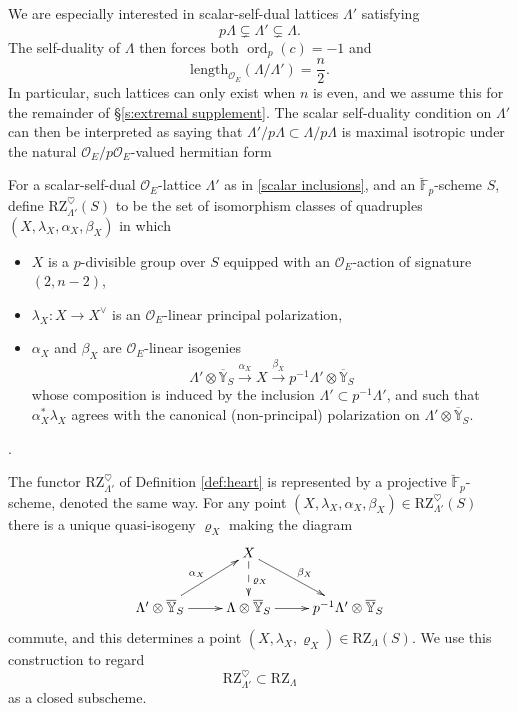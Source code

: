 \documentclass[11pt]{alggeom}
\newcommand{\map}[1]{\xrightarrow{#1}}
\newcommand{\F}{\mathbb F}
\newcommand{\co}{\mathcal O}
\DeclareMathOperator{\ord}{ord}
\begin{document}
We are especially interested in scalar-self-dual lattices $\Lambda'$ satisfying 
\begin{equation}\label{scalar inclusions}
p\Lambda \subsetneq \Lambda' \subsetneq \Lambda.
\end{equation}
The self-duality of $\Lambda$ then forces both $\ord_p(c)= -1$ and
\[
\mathrm{length}_{\co_E}( \Lambda/\Lambda') =\frac{n}{2}  .
\]
In particular, such lattices can only exist when $n$ is even, and we assume this for the remainder of 
\S \ref{s:extremal supplement}.
The scalar self-duality condition on $\Lambda'$ can then be interpreted as saying that 
 $\Lambda'/p\Lambda \subset \Lambda/p\Lambda$ is maximal isotropic under the natural $\co_E/p\co_E$-valued hermitian form



\begin{definition}\label{def:heart}
For a scalar-self-dual $\co_E$-lattice $\Lambda'$ as in \eqref{scalar inclusions},  and an  
$\breve{\F}_p$-scheme $S$, define  $\mathrm{RZ}_{\Lambda'}^\heartsuit(S)$ to be the set of isomorphism classes of quadruples $(X,\lambda_X,\alpha_X,\beta_X)$ in which 
\begin{itemize}
\item
$X$ is a $p$-divisible group over $S$ equipped with an $\co_E$-action of signature $(2,n-2)$, 
\item
$\lambda_X : X \to X^\vee$ is an $\co_E$-linear principal polarization, 
\item
$\alpha_X$ and $\beta_X$ are $\co_E$-linear isogenies
\[
\Lambda' \otimes \overline{\mathbb{Y}}_S
  \map{\alpha_X}
  X
\map{\beta_X}
p^{-1} \Lambda' \otimes \overline{\mathbb{Y}}_S
\]
whose composition is induced by the inclusion $\Lambda' \subset p^{-1}\Lambda'$, and  such that  $\alpha_X^*\lambda_X$ agrees with the canonical (non-principal) polarization on $\Lambda' \otimes \overline{\mathbb{Y}}_S$.
\end{itemize}.
\end{definition}


The functor $\mathrm{RZ}_{\Lambda'}^\heartsuit$ of Definition \ref{def:heart} is represented by a projective $\breve{\F}_p$-scheme, denoted the same way.
For any point  $(X,\lambda_X,\alpha_X,\beta_X) \in \mathrm{RZ}_{\Lambda'}^\heartsuit(S)$ there is a unique quasi-isogeny $\varrho_X$ making the diagram 
\[
\xymatrix{
& {   X  } \ar[dr]^{\beta_X}  \ar@{-->}[d]^{\varrho_X} \\
{ \Lambda' \otimes \overline{\mathbb{Y}}_S  }  \ar[r]  \ar[ur]^{\alpha_X}& {  \Lambda \otimes \overline{\mathbb{Y}}_S   }  \ar[r]&  {  p^{-1}  \Lambda' \otimes \overline{\mathbb{Y}}_S   }  
}
\]
commute, and this determines a point  $(X,\lambda_X,\varrho_X) \in \mathrm{RZ}_{\Lambda}(S)$.
We use this construction to regard
\[
\mathrm{RZ}_{\Lambda'}^\heartsuit \subset \mathrm{RZ}_{\Lambda}
\]
as a closed subscheme.
\end{document}
